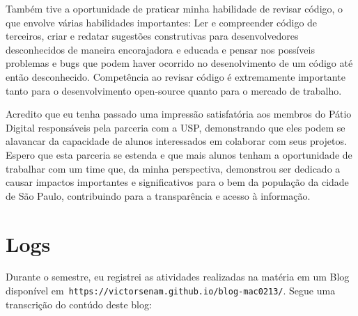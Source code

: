 \documentclass[a4paper, 11pt]{article} %
\begin{document}
Também tive a oportunidade de praticar minha habilidade de revisar código, o que envolve várias habilidades importantes: Ler e compreender código de terceiros, criar e redatar sugestões construtivas para desenvolvedores desconhecidos de maneira encorajadora e educada e pensar nos possíveis problemas e bugs que podem haver ocorrido no desenolvimento de um código até então desconhecido. Competência ao revisar código é extremamente importante tanto para o desenvolvimento open-source quanto para o mercado de trabalho.

Acredito que eu tenha passado uma impressão satisfatória aos membros do Pátio Digital responsáveis pela parceria com a USP, demonstrando que eles podem se alavancar da capacidade de alunos interessados em colaborar com seus projetos. Espero que esta parceria se estenda e que mais alunos tenham a oportunidade de trabalhar com um time que, da minha perspectiva, demonstrou ser dedicado a causar impactos importantes e significativos para o bem da população da cidade de São Paulo, contribuindo para a transparência e acesso à informação.


\section*{Logs}

Durante o semestre, eu registrei as atividades realizadas na matéria em um Blog disponível em~\texttt{https://victorsenam.github.io/blog-mac0213/}. Segue uma transcrição do contúdo deste blog:


\end{document}
